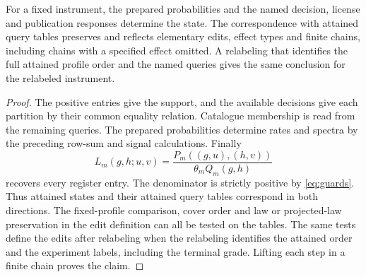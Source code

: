\begin{proposition}\label{prop:readback}
For a fixed instrument, the prepared probabilities and the named
decision, license and publication responses determine the state.
The correspondence with attained query tables preserves and reflects
elementary edits, effect types and finite chains, including chains with
a specified effect omitted. A relabeling that identifies the full
attained profile order and the named queries gives the same conclusion
for the relabeled instrument.
\end{proposition}
\begin{proof}
The positive entries give the support, and the available decisions give each
partition by their common equality relation. Catalogue membership is read
from the remaining queries. The prepared probabilities determine rates and
spectra by the preceding row-sum and signal calculations. Finally
\[
 L_m(g,h;u,v)=\frac{P_m((g,u),(h,v))}{\theta_m Q_m(g,h)}
\]
recovers every register entry. The denominator is strictly positive by
\eqref{eq:guards}. Thus attained states and their attained query tables
correspond in both directions. The fixed-profile comparison, cover order and
law or projected-law preservation in the edit definition can all be tested
on the tables. The same tests define the edits after relabeling when
the relabeling identifies the attained order and the experiment labels,
including the terminal grade. Lifting each step in a finite chain proves
the claim.
\end{proof}
